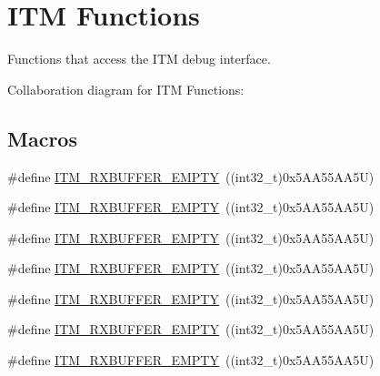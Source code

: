 \hypertarget{group___c_m_s_i_s__core___debug_functions}{}\section{I\+TM Functions}
\label{group___c_m_s_i_s__core___debug_functions}


Functions that access the I\+TM debug interface.  


Collaboration diagram for I\+TM Functions\+:
\subsection*{Macros}
\begin{DoxyCompactItemize}
\item 
\#define \hyperlink{group___c_m_s_i_s__core___debug_functions_gaa822cb398ee022b59e9e6c5d7bbb228a}{I\+T\+M\+\_\+\+R\+X\+B\+U\+F\+F\+E\+R\+\_\+\+E\+M\+P\+TY}~((int32\+\_\+t)0x5\+A\+A55\+A\+A5\+U)
\item 
\#define \hyperlink{group___c_m_s_i_s__core___debug_functions_gaa822cb398ee022b59e9e6c5d7bbb228a}{I\+T\+M\+\_\+\+R\+X\+B\+U\+F\+F\+E\+R\+\_\+\+E\+M\+P\+TY}~((int32\+\_\+t)0x5\+A\+A55\+A\+A5\+U)
\item 
\#define \hyperlink{group___c_m_s_i_s__core___debug_functions_gaa822cb398ee022b59e9e6c5d7bbb228a}{I\+T\+M\+\_\+\+R\+X\+B\+U\+F\+F\+E\+R\+\_\+\+E\+M\+P\+TY}~((int32\+\_\+t)0x5\+A\+A55\+A\+A5\+U)
\item 
\#define \hyperlink{group___c_m_s_i_s__core___debug_functions_gaa822cb398ee022b59e9e6c5d7bbb228a}{I\+T\+M\+\_\+\+R\+X\+B\+U\+F\+F\+E\+R\+\_\+\+E\+M\+P\+TY}~((int32\+\_\+t)0x5\+A\+A55\+A\+A5\+U)
\item 
\#define \hyperlink{group___c_m_s_i_s__core___debug_functions_gaa822cb398ee022b59e9e6c5d7bbb228a}{I\+T\+M\+\_\+\+R\+X\+B\+U\+F\+F\+E\+R\+\_\+\+E\+M\+P\+TY}~((int32\+\_\+t)0x5\+A\+A55\+A\+A5\+U)
\item 
\#define \hyperlink{group___c_m_s_i_s__core___debug_functions_gaa822cb398ee022b59e9e6c5d7bbb228a}{I\+T\+M\+\_\+\+R\+X\+B\+U\+F\+F\+E\+R\+\_\+\+E\+M\+P\+TY}~((int32\+\_\+t)0x5\+A\+A55\+A\+A5\+U)
\item 
\#define \hyperlink{group___c_m_s_i_s__core___debug_functions_gaa822cb398ee022b59e9e6c5d7bbb228a}{I\+T\+M\+\_\+\+R\+X\+B\+U\+F\+F\+E\+R\+\_\+\+E\+M\+P\+TY}~((int32\+\_\+t)0x5\+A\+A55\+A\+A5\+U)
\end{DoxyCompactItemize}
